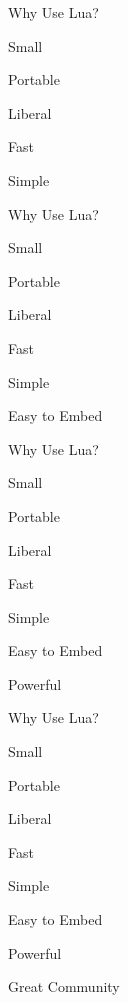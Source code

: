 \begin{itemslide}{Why Use Lua?}
\pause \item Small
\pause \item Portable
\pause \item Liberal %
\pause \item Fast
\pause \item Simple
\end{itemslide}


\begin{itemslide}{Why Use Lua?}
\item Small
\item Portable
\item Liberal %
\item Fast
\item Simple
\item Easy to Embed
\end{itemslide}


\begin{itemslide}{Why Use Lua?}
\item Small
\item Portable
\item Liberal %
\item Fast
\item Simple
\item Easy to Embed
\item Powerful
\end{itemslide}





\begin{itemslide}{Why Use Lua?}
\item Small
\item Portable
\item Liberal %
\item Fast
\item Simple
\item Easy to Embed
\item Powerful
\item Great Community
\end{itemslide}
